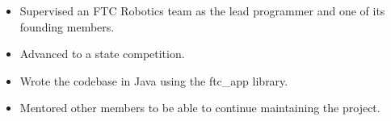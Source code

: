 \documentclass[11pt,letterpaper,ragged2e]{altacv}
\begin{document}
{}
\smallskip
\begin{itemize}
\item Supervised an FTC Robotics team as the lead programmer and one of its founding members.
\item Advanced to a state competition.
\item Wrote the codebase in Java using the ftc\_app library.
\item Mentored other members to be able to continue maintaining the project.
\end{itemize}






\clearpage


\nocite{*}






\end{document}
